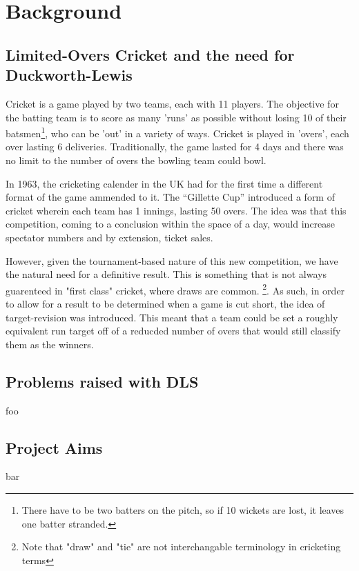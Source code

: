 \chapter{Background}

\section{Limited-Overs Cricket and the need for Duckworth-Lewis}
Cricket is a game played by two teams, each with 11 players. The objective for the batting team is to score as many 'runs' as possible
without losing 10 of their batsmen\footnote{There have to be two batters on the pitch, so if 10 wickets are lost, it leaves one batter stranded.}, 
who can be 'out' in a variety of ways. Cricket is played in 'overs', each over lasting 6 deliveries. Traditionally, the game lasted for 4 days
and there was no limit to the number of overs the bowling team could bowl. 

In 1963, the cricketing calender in the UK had for the first time a different format of the game ammended to it.
The ``Gillette Cup'' introduced a form of cricket wherein each team has 1 innings, lasting 50 overs. The idea was 
that this competition, coming to a conclusion within the space of a day, would increase spectator numbers and by extension,
ticket sales.

However, given the tournament-based nature of this new competition, we have the natural need for a definitive result.
This is something that is not always guarenteed in "first class" cricket, where draws are common. \footnote{Note that 
"draw" and "tie" are not interchangable terminology in cricketing terms}. As such, in order to allow for a result to be
determined when a game is cut short, the idea of target-revision was introduced. This meant that a team could be set a
roughly equivalent run target off of a reducded number of overs that would still classify them as the winners.

\section{Problems raised with DLS}
foo

\section{Project Aims}
bar

